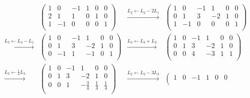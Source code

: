 \begin{example}
    \begin{align*}
        &\left(
        \begin{array}{ccc|ccc}
            1 & 0 & -1 & 1 & 0 & 0 \\
            2 & 1 & 1  & 0 & 1 & 0 \\
            1 & -1 & 0 & 0 & 0 & 1 \\
        \end{array}
        \right)
        &
        \xrightarrow{L_2 \leftarrow L_2 - 2L_1}
        &
        \left(
        \begin{array}{ccc|ccc}
            1 & 0 & -1 & 1 & 0 & 0 \\
            0 & 1 & 3  & -2 & 1 & 0 \\
            1 & -1 & 0 & 0 & 0 & 1 \\
        \end{array}
        \right) \\
        \xrightarrow{L_3 \leftarrow L_3 - L_1}
        &
        \left(
        \begin{array}{ccc|ccc}
            1 & 0 & -1 & 1 & 0 & 0 \\
            0 & 1 & 3  & -2 & 1 & 0 \\
            0 & -1 & 1 & -1 & 0 & 1 \\
        \end{array}
        \right)
        &
        \xrightarrow{L_3 \leftarrow L_3 + L_2}
        &
        \left(
        \begin{array}{ccc|ccc}
            1 & 0 & -1 & 1 & 0 & 0 \\
            0 & 1 & 3  & -2 & 1 & 0 \\
            0 & 0 & 4 & -3 & 1 & 1 \\
        \end{array}
        \right)
        \\
        \xrightarrow{L_3 \leftarrow \frac{1}{4}L_3}
        &
        \left(
        \begin{array}{ccc|ccc}
            1 & 0 & -1 & 1 & 0 & 0 \\
            0 & 1 & 3  & -2 & 1 & 0 \\
            0 & 0 & 1 & -\frac{3}{4} & \frac{1}{4} & \frac{1}{4} \\
        \end{array}
        \right)
        &
        \xrightarrow{L_2 \leftarrow L_2 - 3L_3}
        &
        \left(
        \begin{array}{ccc|ccc}
            1 & 0 & -1 & 1 & 0 & 0 \\

\end{array}
\end{align*}
\end{example}
